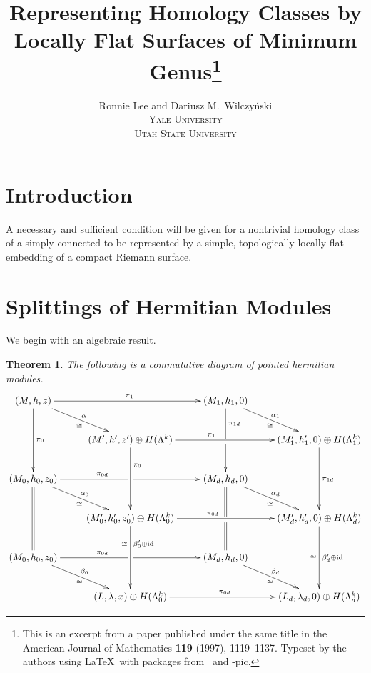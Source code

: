 \documentclass[11pt]{article}
\title{\huge 
	Representing Homology Classes by Locally Flat
	Surfaces of Minimum Genus\thanks{This is an excerpt from a paper published under the same title
in the American Journal of Mathematics \textbf{119} (1997), 1119--1137.
Typeset by the authors using \LaTeX\ 
with packages from \AmS\ and \Xy-pic.}
}
\author{Ronnie Lee and Dariusz M.~Wilczy\'{n}ski\\
\small\scshape Yale University\\
\small\scshape Utah State University}
\date{}
\newtheorem{thm}{Theorem}
\begin{document}
\maketitle
\thispagestyle{empty}

\section{Introduction}

A necessary and sufficient condition will be given for a nontrivial homology class
of a simply connected \text{4-manifold} to be represented by a simple, topologically
locally flat embedding of a compact Riemann surface.

\section{Splittings of Hermitian Modules}

We begin with an algebraic result.

\begin{thm}
The following is a commutative diagram of pointed hermitian modules.\\
 \[\xymatrix{
 (M,h,z) \ar[dd]^{\pi_0} \ar[dr]^\alpha_\cong \ar[rr]^{\pi_1}
 && (M_1,h_1,0) \ar'[d]^-{\pi_{1d}}[dd] \ar[dr]^{\alpha_1}_\cong
 \\
 & (M',h',z')\oplus H(\Lambda^k) \ar[dd]^<(.25){\pi_0} \ar[rr]^<(.25){\pi_1}
 && (M'_1,h'_1,0)\oplus H(\Lambda_1^k) \ar[dd]^{\pi_{1d}}
 \\
 (M_0,h_0,z_0) \ar@{=}[dd] \ar[dr]^{\alpha_0}_\cong \ar'[r]^<(.6){\pi_{0d}}[rr]
 && (M_d,h_d,0) \ar@{=}'[d][dd] \ar[dr]^{\alpha_d}_\cong
 \\
 & (M'_0,h'_0,z'_0)\oplus H(\Lambda_0^k) \ar[dd]^<(.25){\beta'_0\oplus\text{id}}_<(.25)\cong
\ar[rr]^<(.25){\pi_{0d}}
 && (M'_d,h'_d,0)\oplus H(\Lambda_d^k) \ar[dd]^{\beta'_d\oplus\text{id}}_\cong
 \\
 (M_0,h_0,z_0) \ar[dr]^{\beta_0}_\cong \ar'[r]^<(.6){\pi_{0d}}[rr]
 && (M_d,h_d,0) \ar[dr]^{\beta_d}_\cong
 \\
 & (L,\lambda,x)\oplus H(\Lambda_0^k) \ar[rr]^{\pi_{0d}}
 && (L_d,\lambda_d,0)\oplus H(\Lambda_d^k)
 }\]
\end{thm}

\vphantom{X}
\end{document}
